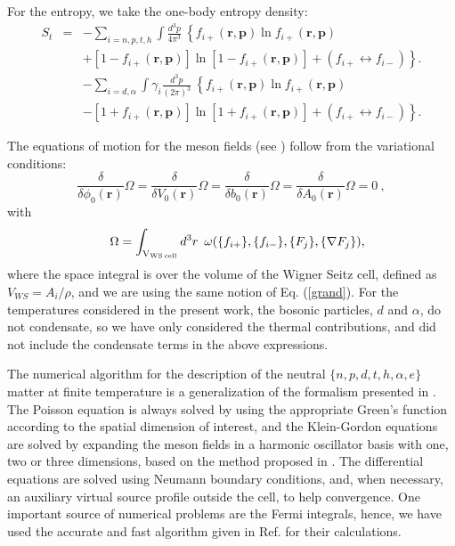 \documentclass[aps,prc,nofootinbib,twocolumn,showpacs]{revtex4-1}
\begin{document}
For the entropy, we take
the one-body entropy density:
\begin{eqnarray}
 S_t&=&  -\sum_{i=n,p,t,h}\int \frac{d^3 p}{4\pi^3} ~
\left\{ f_{i+}(\mathbf r, \mathbf p) \ln f_{i+} (\mathbf r, \mathbf p) \right.
\\
&&\left. +\left[1- f_{i+}(\mathbf r, \mathbf p)\right] \ln \left[1-f_{i+} (\mathbf r, \mathbf p)\right] +
( f_{i+} \leftrightarrow f_{i-} )
\right\}.\nonumber\\
  &&  -\sum_{i=d,\alpha} \int \gamma_i\frac{d^3 p}{(2\pi)^3} ~
\left\{ f_{i+}(\mathbf r, \mathbf p) \ln f_{i+} (\mathbf r, \mathbf p)
\right. \nonumber\\
&&\left.-\left[1+ f_{i+}(\mathbf r, \mathbf p)\right] \ln
  \left[1+f_{i+} (\mathbf r, \mathbf p)\right] 
+ ( f_{i+} \leftrightarrow f_{i-} )
\right\}.\nonumber
\end{eqnarray}


 The equations of motion for the meson fields (see \cite{pasta1})  follow from the variational 
conditions:
\begin{equation}
\frac{\delta}{\delta \phi_0(\mathbf r)} \Omega =
\frac{\delta}{\delta V_0(\mathbf r)} \Omega = \frac{\delta}{\delta b_0(\mathbf r)} \Omega =   \frac{\delta}{\delta A_0(\mathbf r)} \Omega =  0 ~ ,
\label{meson}
\end{equation}
with
\begin{eqnarray}
 &&\Omega = \int_{\rm{V_{WS \, cell}}} d^3 r   \,\,\, \omega
    (\{f_{i+}\},\{f_{i-}\}, \{ F_j\}, \{\nabla F_j\}), \label{grand1}
\end{eqnarray}
where the space integral is over the volume of the Wigner Seitz cell, defined as $V_{WS}=A_i/\rho$,
 and we are using the same notion of Eq. (\ref{grand}). For
the temperatures considered in the present work, the bosonic particles,
$d$ and $\alpha$, do not condensate, so we have only considered the
thermal contributions, and did not include the condensate terms in the above expressions.

The numerical algorithm for the description of the neutral
$\{n,p,d,t,h,\alpha, e\}$ matter at finite temperature is
a generalization of the formalism presented in \cite{silvia10}.
The Poisson equation is always solved by using the appropriate Green's
function according to the  spatial dimension of interest, and the
Klein-Gordon equations are solved by expanding the meson fields in a harmonic
oscillator basis with one, two or three dimensions, based on the method
proposed in \cite{ring}. The differential equations are solved using Neumann boundary
conditions, and, when necessary, an auxiliary virtual source profile outside the cell, to
help convergence.
 One important source of numerical problems are the Fermi integrals, hence,
we have used the accurate and fast algorithm given in Ref. \cite{aparicio} for their calculations.
\end{document}
